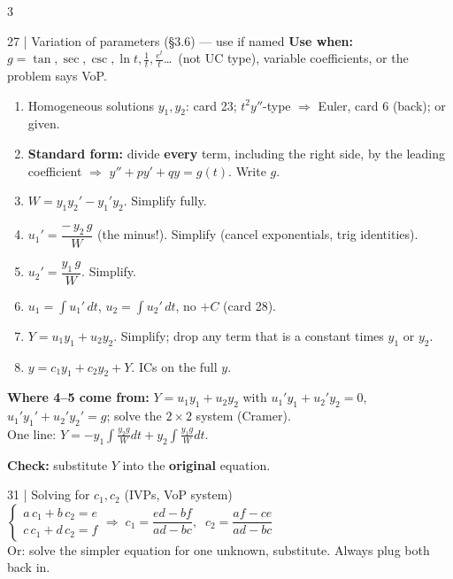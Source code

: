 \documentclass[8pt]{extarticle}
\newcommand{\key}[1]{\textcolor{grn}{\textbf{#1}}}
\newcommand{\when}[1]{\textcolor{amb}{\textbf{Use when:}} #1\par}
\newcommand{\chk}[1]{\par\textcolor{grn}{\textbf{Check:}} #1}
\begin{document}
\begin{multicols*}{3}
\begin{card}{27 \;|\; Variation of parameters (\S3.6) --- \textnormal{use if named}}
\when{$g=\tan,\sec,\csc,\ln t,\frac1t,\frac{e^t}{t}$\dots\ (not UC type), variable coefficients, or the problem says VoP.}
\begin{enumerate}
\item Homogeneous solutions $y_1,y_2$: card 23; $t^2y''$-type $\Rightarrow$ Euler, card 6 (back); or given.
\item \key{Standard form:} divide \textbf{every} term, including the right side, by the leading coefficient $\Rightarrow$ $y''+py'+qy=g(t)$. Write $g$.
\item $W=y_1y_2'-y_1'y_2$. Simplify fully.
\item $u_1'=\dfrac{-\,y_2\,g}{W}$ \;(the minus!). Simplify (cancel exponentials, trig identities).
\item $u_2'=\dfrac{y_1\,g}{W}$. Simplify.
\item $u_1=\int u_1'\,dt$, \;$u_2=\int u_2'\,dt$, no $+C$ (card 28).
\item $Y=u_1y_1+u_2y_2$. Simplify; drop any term that is a constant times $y_1$ or $y_2$.
\item $y=c_1y_1+c_2y_2+Y$. ICs on the full $y$.
\end{enumerate}
\key{Where 4--5 come from:} $Y=u_1y_1+u_2y_2$ with \;$u_1'y_1+u_2'y_2=0$, \;$u_1'y_1'+u_2'y_2'=g$; solve the $2\times2$ system (Cramer).\\
One line: $Y=-y_1\!\displaystyle\int\!\frac{y_2g}{W}dt+y_2\!\int\!\frac{y_1g}{W}dt$.
\chk{substitute $Y$ into the \textbf{original} equation.}
\end{card}


\begin{card}{31 \;|\; Solving for $c_1,c_2$ (IVPs, VoP system)}
$\begin{cases}a\,c_1+b\,c_2=e\\ c\,c_1+d\,c_2=f\end{cases}\Rightarrow\; c_1=\dfrac{ed-bf}{ad-bc},\;\; c_2=\dfrac{af-ce}{ad-bc}$\\
Or: solve the simpler equation for one unknown, substitute. Always plug both back in.
\end{card}


\end{multicols*}
\end{document}
